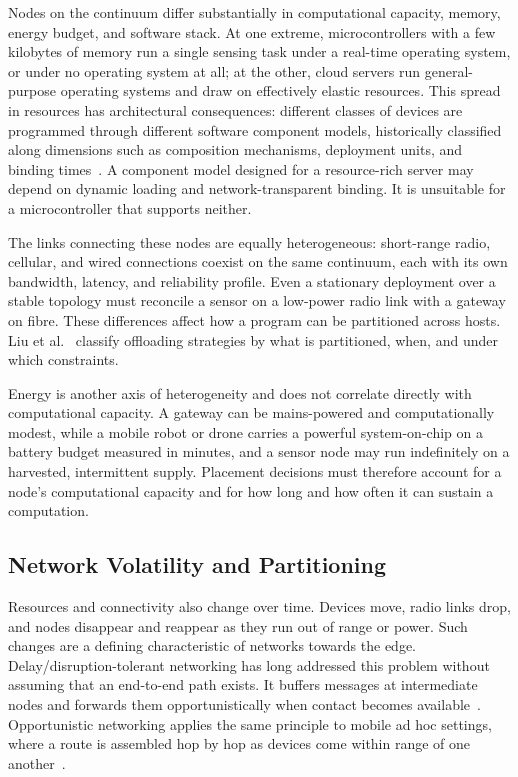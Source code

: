 Nodes on the continuum differ substantially in computational capacity,
memory,
energy budget,
and software stack.
%
At one extreme,
microcontrollers with a few kilobytes of memory run a single sensing task under a real-time operating system,
or under no operating system at all;
at the other,
cloud servers run general-purpose operating systems and draw on effectively elastic resources.
%
This spread in resources has architectural consequences:
different classes of devices are programmed through different software component models,
historically classified along dimensions such as composition mechanisms,
deployment units,
and binding times~\cite{DBLP:journals/tse/CrnkovicSVC11}.
%
A component model designed for a resource-rich server may depend on dynamic loading and network-transparent binding.
It is unsuitable for a microcontroller that supports neither.

The links connecting these nodes are equally heterogeneous:
short-range radio,
cellular,
and wired connections coexist on the same continuum,
each with its own bandwidth,
latency,
and reliability profile.
%
Even a stationary deployment over a stable topology must reconcile a sensor on a low-power radio link with a gateway on fibre.
%
These differences affect how a program can be partitioned across hosts.
Liu et al.~\cite{DBLP:journals/jnca/LiuASGBQ15} classify offloading strategies by what is partitioned,
when,
and under which constraints.

Energy is another axis of heterogeneity and does not correlate directly with computational capacity.
%
A gateway can be mains-powered and computationally modest,
while a mobile robot or drone carries a powerful system-on-chip on a battery budget measured in minutes,
and a sensor node may run indefinitely on a harvested,
intermittent supply.
%
Placement decisions must therefore account for a node's computational capacity and for how long and how often it can sustain a computation.


\subsection{Network Volatility and Partitioning}
\label{subsec:network-volatility}

Resources and connectivity also change over time.
%
Devices move,
radio links drop,
and nodes disappear and reappear as they run out of range or power.
Such changes are a defining characteristic of networks towards the edge.
%
Delay/disruption-tolerant networking has long addressed this problem without assuming that an end-to-end path exists.
It buffers messages at intermediate nodes and forwards them opportunistically when contact becomes available~\cite{DBLP:conf/sigcomm/Fall03}.
%
Opportunistic networking applies the same principle to mobile ad hoc settings,
where a route is assembled hop by hop as devices come within range of one another~\cite{DBLP:journals/cm/PelusiPC06}.

